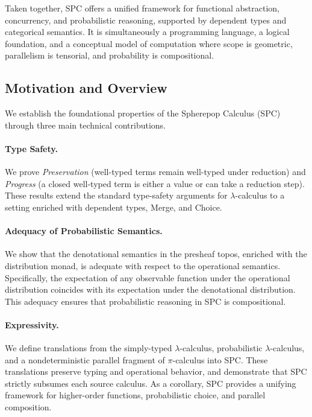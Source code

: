 \documentclass{article}
\begin{document}
Taken together, SPC offers a unified framework for functional abstraction,
concurrency, and probabilistic reasoning, supported by dependent types and
categorical semantics. It is simultaneously a programming language, a logical
foundation, and a conceptual model of computation where scope is geometric,
parallelism is tensorial, and probability is compositional.

\subsection{Motivation and Overview}

We establish the foundational properties of the Spherepop Calculus (SPC) through
three main technical contributions.

\paragraph{Type Safety.}
We prove \emph{Preservation} (well-typed terms remain well-typed under reduction)
and \emph{Progress} (a closed well-typed term is either a value or can take a
reduction step). These results extend the standard type-safety arguments for
$\lambda$-calculus to a setting enriched with dependent types, Merge, and
Choice.

\paragraph{Adequacy of Probabilistic Semantics.}
We show that the denotational semantics in the presheaf topos, enriched with the
distribution monad, is adequate with respect to the operational semantics.
Specifically, the expectation of any observable function under the operational
distribution coincides with its expectation under the denotational distribution.
This adequacy ensures that probabilistic reasoning in SPC is compositional.

\paragraph{Expressivity.}
We define translations from the simply-typed $\lambda$-calculus, probabilistic
$\lambda$-calculus, and a nondeterministic parallel fragment of $\pi$-calculus
into SPC. These translations preserve typing and operational behavior, and
demonstrate that SPC strictly subsumes each source calculus. As a corollary, SPC
provides a unifying framework for higher-order functions, probabilistic choice,
and parallel composition.
\end{document}
